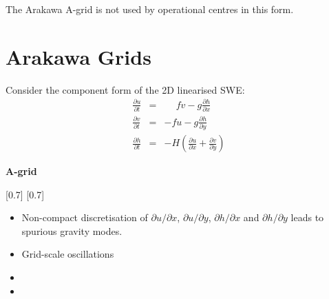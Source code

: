 The Arakawa A-grid is not used by operational centres in this form.

\clearpage{}

\section{Arakawa Grids \citep{AL77}}

Consider the component form of the 2D linearised SWE:
\begin{eqnarray}
\frac{\partial u}{\partial t} & = & \phantom{-}fv-g\frac{\partial h}{\partial x}\label{eq:linSWEu}\\
\frac{\partial v}{\partial t} & = & -fu-g\frac{\partial h}{\partial y}\label{eq:linSWEv}\\
\frac{\partial h}{\partial t} & = & -H\left(\frac{\partial u}{\partial x}+\frac{\partial v}{\partial y}\right)\label{eq:linSWEh}
\end{eqnarray}
\begin{minipage}[t]{0.28\columnwidth}%
\begin{center}
\textbf{A-grid}
\par\end{center}
%
{\scalebox{0.7}[0.7]{}}
{\scalebox{0.7}[0.7]{}}%
\end{minipage} %
\begin{minipage}[t]{0.7\columnwidth}%
\phantom{}
\begin{itemize}
\item Non-compact discretisation of $\partial u/\partial x$, $\partial u/\partial y$,
$\partial h/\partial x$ and $\partial h/\partial y$ leads to spurious
gravity modes. 
\item Grid-scale oscillations 
\item {}
\item {}
\end{itemize}
%
\end{minipage}

